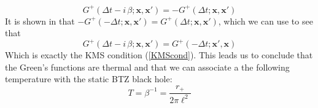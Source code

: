 %
%
\begin{equation}
G^+(\Delta t - i \, \beta; \mathbf{x}, \mathbf{x'}) = - G^+(\Delta t; \mathbf{x}, \mathbf{x'})
\end{equation}
%
%
It is shown in \cite{Green} that $-G^+(- \Delta t; \mathbf{x}, \mathbf{x'}) = G^+(\Delta t; \mathbf{x}, \mathbf{x'})$, which we can use to see that
%
%
\begin{equation}
G^+(\Delta t - i \, \beta; \mathbf{x}, \mathbf{x'}) = G^+(- \Delta t; \mathbf{x'}, \mathbf{x})
\end{equation}
Which is exactly the KMS condition (\ref{KMScond}). This leads us to conclude that the Green's functions are thermal and that we can associate a the following temperature with the static BTZ black hole:
%
%
\begin{equation}
\boxed{
T = \beta^{-1}
=  \frac{r_+}{2 \pi \ell^2}
}
\end{equation}
%
%

